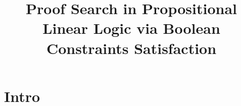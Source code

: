 \documentclass[a4paper, 12pt, english]{report}
\title{Proof Search in Propositional Linear Logic via Boolean Constraints Satisfaction
}
\begin{document}
\maketitle
\newpage
\tableofcontents
\newpage


\chapter{Intro}
% 
% 
% 
% 
\end{document}
